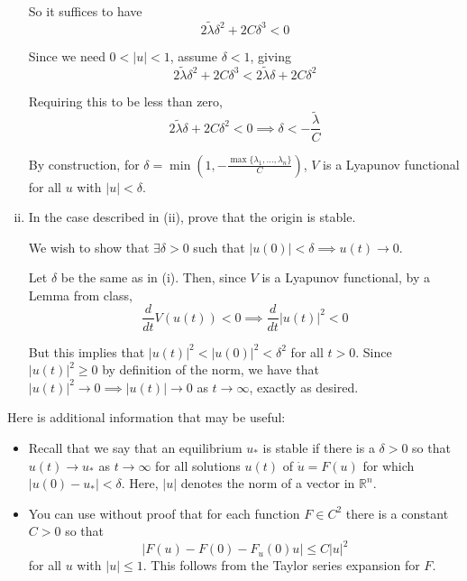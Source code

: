 \documentclass[12pt]{article}
\newcommand{\R}{\mathbb{R}}
\newcommand{\abs}[1]{\left\vert #1 \right\vert}
\begin{document}
\begin{enumerate}[(i)]
          So it suffices to have
          \[2\tilde \lambda \delta^2 + 2C \delta^3 < 0\]

          Since we need $0 < \abs{u} < 1$, assume $\delta < 1$, giving
          \[2\tilde \lambda \delta^2 + 2C \delta^3  < 2\tilde \lambda \delta + 2C \delta^2\]

          Requiring this to be less than zero,
          \[2\tilde \lambda \delta + 2C \delta^2 < 0 \implies \delta < -\frac{\tilde \lambda}{C} \]

          By construction, for $\delta = \min\left(1, -\frac{\max\{\lambda_1, \dots, \lambda_n\}}{C}\right)$, $V$ is a Lyapunov functional for all $u$ with $\abs{u} < \delta$.

          \color{black}
    \item In the case described in (ii), prove that the origin is stable.

          \color{blue}
          We wish to show that $\exists \delta > 0$ such that $\abs{u(0)} < \delta \implies u(t) \to 0$.

          Let $\delta$ be the same as in (i). Then, since $V$ is a Lyapunov functional, by a Lemma from class,
          \[\frac{d}{dt} V(u(t)) < 0 \implies \frac{d}{dt}\abs{u(t)}^2 < 0    \]

          But this implies that $\abs{u(t)}^2 < \abs{u(0)}^2 < \delta^2$ for all $t > 0$. Since $\abs{u(t)}^2 \geq 0$ by definition of the norm, we have that $\abs{u(t)}^2 \to 0 \implies \abs{u(t)} \to 0$ as $t \to \infty$, exactly as desired.
          \color{black}
\end{enumerate}

Here is additional information that may be useful:
\begin{itemize}
    \item  Recall that we say that an equilibrium $u_*$ is stable if there is a $\delta>0$ so that $u(t)\to u_*$ as $t\to\infty$ for all solutions $u(t)$ of $\dot{u}=F(u)$ for which $|u(0)-u_*|<\delta$. Here, $|u|$ denotes the norm of a vector in $\R^n$.
    \item You can use without proof that for each function $F\in C^2$ there is a constant $C>0$ so that
          \[
              |F(u)-F(0)-F_u(0)u| \leq C |u|^2
          \]
          for all $u$ with $|u|\leq1$. This follows from the Taylor series expansion for $F$.
\end{itemize}

\pagebreak

\end{document}
